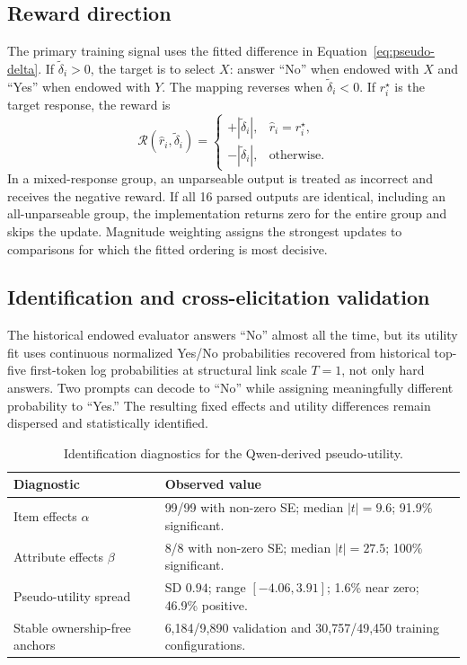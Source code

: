 \documentclass[11pt,letterpaper]{article}
\newcommand{\dd}{\widetilde{\delta}}
\begin{document}
\subsection{Reward direction}

The primary training signal uses the fitted difference in
Equation~\ref{eq:pseudo-delta}. If $\dd_i>0$, the target is to select $X$:
answer ``No'' when endowed with $X$
and ``Yes'' when endowed with $Y$. The mapping reverses when $\dd_i<0$. If
$r_i^\star$ is the target response, the reward is
\begin{equation}
\mathcal R(\widehat r_i,\dd_i)=
\begin{cases}
+|\dd_i|,&\widehat r_i=r_i^\star,\\
-|\dd_i|,&\text{otherwise}.
\end{cases}
\label{eq:reward}
\end{equation}
In a mixed-response group, an unparseable output is treated as incorrect and
receives the negative reward. If all 16 parsed outputs are identical, including
an all-unparseable group, the implementation returns zero for the entire group
and skips the update. Magnitude weighting assigns the strongest updates to
comparisons for which the fitted ordering is most decisive.

\subsection{Identification and cross-elicitation validation}

The historical endowed evaluator answers ``No'' almost all the time, but its
utility fit uses continuous normalized Yes/No probabilities recovered from
historical top-five first-token log probabilities at structural link scale
$T=1$, not only hard answers. Two prompts can decode to ``No'' while assigning
meaningfully different probability to ``Yes.'' The resulting fixed effects and
utility differences remain dispersed and statistically identified.

\begin{table}[htbp]
\centering
\small
\begin{tabular}{p{}p{}}
\toprule
Diagnostic & Observed value \\
\midrule
Item effects $\alpha$ & 99/99 with non-zero SE; median $|t|=9.6$; 91.9\% significant. \\
Attribute effects $\beta$ & 8/8 with non-zero SE; median $|t|=27.5$; 100\% significant. \\
Pseudo-utility spread & SD $0.94$; range $[-4.06,3.91]$; 1.6\% near zero; 46.9\% positive. \\
Stable ownership-free anchors & 6,184/9,890 validation and 30,757/49,450 training configurations. \\
\bottomrule
\end{tabular}
\caption{Identification diagnostics for the Qwen-derived pseudo-utility.}
\label{tab:delta-identification}
\end{table}
\end{document}
